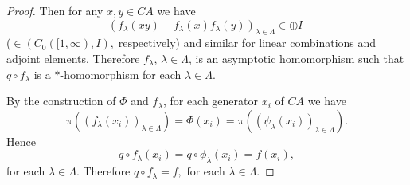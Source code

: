 \documentclass[10pt,a4paper]{amsart}
\begin{document}
\begin{proof}
  Then for any $x, y\in CA$ we have
 $$\left(f_{\lambda}(xy) - f_{\lambda}(x)f_{\lambda}(y)\right)_{\lambda\in \Lambda}\in \oplus I  \; $$
  ($\in (C_0([1, \infty), I), \;\text{respectively}$) and similar for linear combinations and adjoint elements. Therefore
 $f_{\lambda}$, $\lambda\in \Lambda$, is an asymptotic homomorphism such that
  $q\circ f_{\lambda}$ is a $\ast$-homomorphism for each $\lambda\in \Lambda$.

  By the construction of $\Phi$ and $f_{\lambda}$, for each generator $x_i$ of $CA$ we have
  $$\pi\left((f_{\lambda}(x_i))_{\lambda\in\Lambda}\right) = \Phi(x_i) = \pi\left((\psi_{\lambda}(x_i))_{\lambda\in\Lambda}\right).$$
  Hence $$q\circ f_{\lambda}(x_i) = q\circ \phi_{\lambda}(x_i) = f(x_i),$$ for each $\lambda\in \Lambda$. Therefore
  $q\circ f_{\lambda} = f, $ for each $\lambda \in \Lambda$.
  \end{proof}
\end{document}
